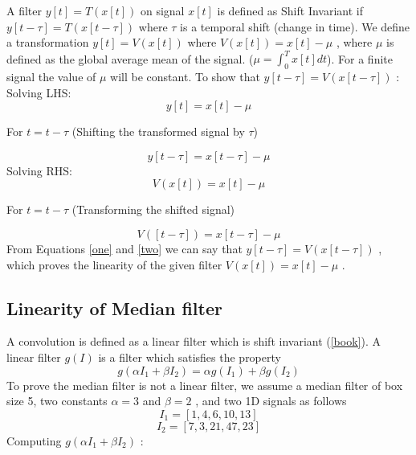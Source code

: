 \documentclass[a4paper,11pt]{article}
\begin{document}
A filter ${y[t] = T(x[t])}$ on signal $x[t]$ is defined as Shift Invariant if ${y[t-\tau] =T(x[t-\tau])}$ where $\tau$ is a temporal shift (change in time).
\newline
\newline We define a transformation ${y[t] = V(x[t])}$ where ${V(x[t]) = x[t] - \mu}$ , where $\mu$ is defined as the global average mean of the signal. (${\mu = \int_{0}^{T} x[t] dt}$).
\newline
\newline For a finite signal the value of $\mu$ will be constant. 
\newline
\newline To show that ${y[t-\tau] =V(x[t-\tau])}$ :
\newline
\newline Solving LHS: 
\[
y[t] = x[t]- \mu
\]
\begin{center}
For $t = t-\tau$ (Shifting the transformed signal by $\tau$)
\end{center}
\begin{equation}
\label{one}
    y[t-\tau] = x[t-\tau] - \mu
\end{equation}
\newline
Solving RHS:
\[
V(x[t]) = x[t]- \mu
\]
\begin{center}
For $t = t-\tau$ (Transforming the shifted signal)
\end{center}
\begin{equation}
\label{two}
    V([t-\tau]) = x[t-\tau] - \mu
\end{equation}
\newline
From Equations \ref{one} and \ref{two} we can say that ${y[t-\tau] =V(x[t-\tau])}$ , which proves the linearity of the given filter ${V(x[t]) = x[t] - \mu}$ .


\subsection{Linearity of Median filter}

A convolution is defined as a linear filter which is shift invariant (\ref{book}). A linear filter $g(I)$ is a filter which satisfies the property $$g(\alpha I_1 + \beta I_2) = \alpha g(I_1) + \beta g(I_2)$$
\newline
To prove the median filter is not a linear filter, we assume a median filter of box size 5, two constants $\alpha = 3$ and $\beta = 2$ , and two 1D signals as follows
$$I_1 = [1,4,6,10,13]$$
$$I_2 = [7,3,21,47,23]$$
\newline
Computing $g(\alpha I_1 + \beta I_2)$ :
\end{document}
